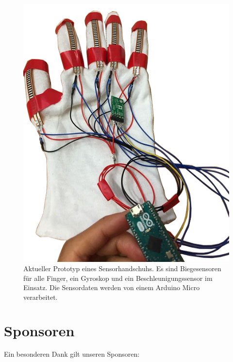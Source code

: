 \documentclass{sciposter}
\begin{document}
\begin{multicols}{3}
\begin{figure}[h]
	\centering
	\includegraphics[scale=1.2]{../figures/Sensorhandschuh_transparent}
	\caption{Aktueller Prototyp eines Sensorhandschuhs. Es sind Biegesensoren für alle Finger, ein Gyroskop und ein Beschleunigungssensor im Einsatz. Die Sensordaten werden von einem Arduino Micro verarbeitet.}
	\label{fig:Sensorhandschuh}
\end{figure}


\section{Sponsoren}
\noindent
Ein besonderen Dank gilt unseren Sponsoren: \\

\vfill


\end{multicols}
\end{document}
